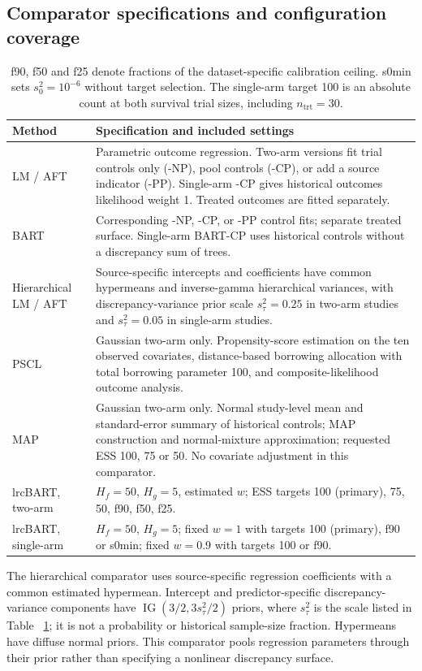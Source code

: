 \documentclass[11pt]{article}
\newcommand{\IG}{\operatorname{IG}}
\theoremstyle{remark}\newtheorem{remark}{Remark}[section]
\providecommand{\DIFaddtex}[1]{{\protect\color{blue} \sf #1}} %
\providecommand{\DIFaddbegin}{} %
\providecommand{\DIFaddend}{} %
\providecommand{\DIFadd}[1]{\texorpdfstring{\DIFaddtex{#1}}{#1}} %
\begin{document}
\subsection{Comparator specifications and configuration coverage}\label{sec:E.4}
\begin{table}[htbp]
\centering\small
\caption{Methods and reporting configurations.}\label{tab:S3}
\begin{tabular}{p{1.2in}p{4.8in}}
\toprule
Method & Specification and included settings\\\midrule
LM / AFT & Parametric outcome regression. Two-arm versions fit trial controls only (-NP), pool controls (-CP), or add a source indicator (-PP). Single-arm -CP gives historical outcomes likelihood weight 1. Treated outcomes are fitted separately.\\
BART & Corresponding -NP, -CP, or -PP control fits; separate treated surface. Single-arm BART-CP uses historical controls without a discrepancy sum of trees.\\
Hierarchical LM / AFT & Source-specific intercepts and coefficients have common hypermeans and inverse-gamma hierarchical variances, with discrepancy-variance prior scale $s_\tau^2=0.25$ in two-arm studies and $s_\tau^2=0.05$ in single-arm studies.\\
PSCL & Gaussian two-arm only. Propensity-score estimation on the ten observed covariates, distance-based borrowing allocation with total borrowing parameter 100, and composite-likelihood outcome analysis.\\
MAP & Gaussian two-arm only. Normal study-level mean and standard-error summary of historical controls; MAP construction and normal-mixture approximation; requested ESS 100, 75 or 50. No covariate adjustment in this comparator.\\
lrcBART, two-arm & $H_f=50$, $H_g=5$, estimated $w$; ESS targets 100 (primary), 75, 50, f90, f50, f25.\\
lrcBART, single-arm & $H_f=50$, $H_g=5$; fixed $w=1$ with targets 100 (primary), f90 or s0min; fixed $w=0.9$ with targets 100 or f90.\\
\bottomrule
\end{tabular}
\caption*{f90, f50 and f25 denote fractions of the dataset-specific calibration ceiling. s0min sets $s_0^2=10^{-6}$ without target selection. The single-arm target 100 is an absolute count at both survival trial sizes, including $n_{\mathrm{trt}}=30$.}
\end{table}

The hierarchical comparator uses source-specific regression coefficients with a common estimated hypermean. Intercept and predictor-specific discrepancy-variance components have $\IG(3/2,3s_\tau^2/2)$ priors, where $s_\tau^2$ is the scale listed in Table \DIFaddbegin \DIFadd{~\ref{tab:S3}}\DIFaddend ; it is not a probability or historical sample-size fraction. Hypermeans have diffuse normal priors. This comparator pools regression parameters through their prior rather than specifying a nonlinear discrepancy surface.
\end{document}

